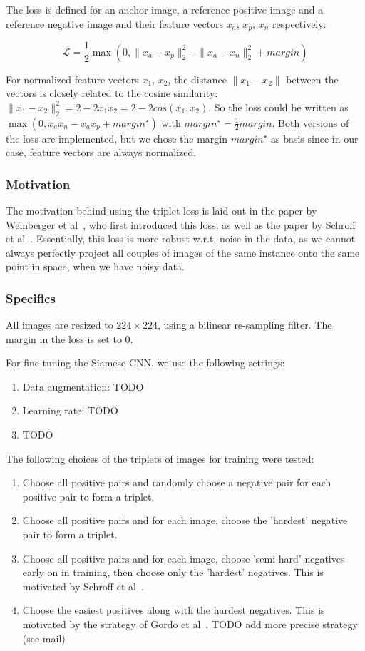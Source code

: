 \documentclass[fleqn]{article}
\begin{document}
The loss is defined for an anchor image, a reference positive image and
a reference negative image and their feature vectors $x_a$, $x_p$, $x_n$
respectively:

\begin{equation}
\mathcal{L} = \frac{1}{2}
\max(0, \| x_a - x_p \|_2^2 - \| x_a - x_n \|_2^2 + margin)
\end{equation}

For normalized feature vectors $x_1$, $x_2$, the distance $\| x_1 - x_2\|$
between the vectors is closely related to the cosine similarity:
$\| x_1 - x_2 \|_2^2 = 2-2x_1x_2 = 2-2cos(x_1,x_2)$.
So the loss could be written as
$\max(0, x_ax_n - x_ax_p + margin^{\star})$ with
$margin^{\star} = \frac{1}{2} margin$. Both versions of the loss
are implemented, but we chose the margin $margin^{\star}$ as basis
since in our case, feature vectors are always normalized.

\subsubsection{Motivation}
The motivation behind using the triplet loss is laid out in the paper
by Weinberger et al~\cite{weinberger_distance_2006}, who first introduced
this loss, as well as the paper by Schroff et al~\cite{schroff_facenet:_2015}.
Essentially, this loss is more robust w.r.t. noise in the data, as
we cannot always perfectly project all couples of images of the same
instance onto the same point in space, when we have noisy data.

\subsubsection{Specifics}
All images are resized to $224 \times 224$, using a bilinear
re-sampling filter. The margin in the loss is set to 0.

For fine-tuning the Siamese CNN, we use the following settings:
\begin{enumerate}
    \item Data augmentation: TODO
    \item Learning rate: TODO
    \item TODO
\end{enumerate}

The following choices of the triplets of images for training were tested:
\begin{enumerate}
    \item Choose all positive pairs and randomly choose a negative pair
    for each positive pair to form a triplet.
    \item Choose all positive pairs and for each image, choose the
    'hardest' negative pair to form a triplet.
    \item Choose all positive pairs and for each image, choose 'semi-hard'
    negatives early on in training, then choose only the 'hardest'
    negatives. This is motivated by Schroff et al~\cite{schroff_facenet:_2015}.
    \item Choose the easiest positives along with the hardest negatives.
    This is motivated by the strategy of Gordo et al~\cite{gordo_deep_2016}.
    TODO add more precise strategy (see mail)
\end{enumerate}
\end{document}
